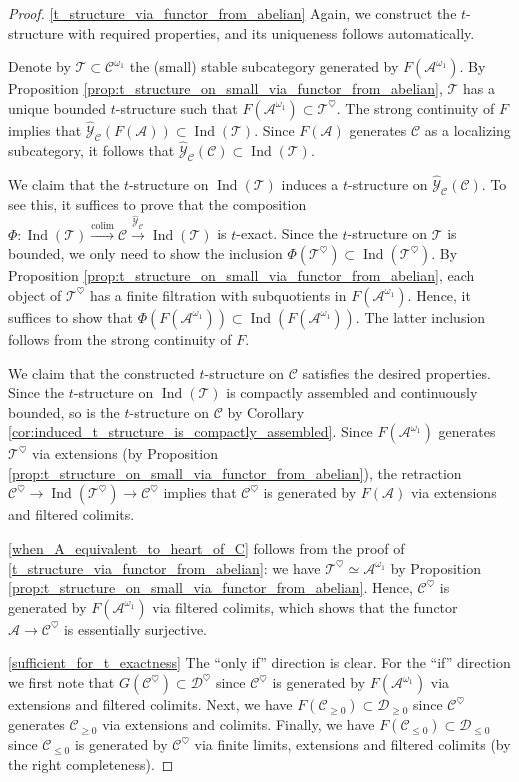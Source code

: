 \documentclass[11pt,leqno]{amsart}
\numberwithin{equation}{section}
\DeclareMathOperator*{\colim}{colim}
\newcommand{\xto}{\xrightarrow}
\newcommand{\cD}{{\mathcal D}}
\newcommand{\cA}{{\mathcal A}}
\newcommand{\cC}{{\mathcal C}}
\newcommand{\cY}{{\mathcal Y}}
\newcommand{\cT}{{\mathcal T}}
\newcommand{\Ind}{\operatorname{Ind}}
\begin{document}
\begin{proof}
\ref{t_structure_via_functor_from_abelian} Again, we construct the $t$-structure with required properties, and its uniqueness follows automatically.

Denote by $\cT\subset\cC^{\omega_1}$ the (small) stable subcategory generated by $F(\cA^{\omega_1}).$ By Proposition \ref{prop:t_structure_on_small_via_functor_from_abelian}, $\cT$ has a unique bounded $t$-structure such that $F(\cA^{\omega_1})\subset \cT^{\heartsuit}.$ The strong continuity of $F$ implies that $\hat{\cY}_{\cC}(F(\cA))\subset \Ind(\cT).$ Since $F(\cA)$ generates $\cC$ as a localizing subcategory, it follows that $\hat{\cY}_{\cC}(\cC)\subset\Ind(\cT).$ 

We claim that the $t$-structure on $\Ind(\cT)$ induces a $t$-structure on $\hat{\cY}_{\cC}(\cC).$ To see this, it suffices to prove that the composition $\Phi:\Ind(\cT)\xto{\colim}\cC\xto{\hat{\cY}_{\cC}}\Ind(\cT)$ is $t$-exact. Since the $t$-structure on $\cT$ is bounded, we only need to show the inclusion $\Phi(\cT^{\heartsuit})\subset \Ind(\cT^{\heartsuit}).$ By Proposition \ref{prop:t_structure_on_small_via_functor_from_abelian}, each object of $\cT^{\heartsuit}$ has a finite filtration with subquotients in $F(\cA^{\omega_1}).$ Hence, it suffices to show that $\Phi(F(\cA^{\omega_1}))\subset \Ind(F(\cA^{\omega_1})).$ The latter inclusion follows from the strong continuity of $F.$

We claim that the constructed $t$-structure on $\cC$ satisfies the desired properties. Since the $t$-structure on $\Ind(\cT)$ is compactly assembled and continuously bounded, so is the $t$-structure on $\cC$ by Corollary \ref{cor:induced_t_structure_is_compactly_assembled}. Since $F(\cA^{\omega_1})$ generates $\cT^{\heartsuit}$ via extensions (by Proposition \ref{prop:t_structure_on_small_via_functor_from_abelian}), the retraction $\cC^{\heartsuit}\to\Ind(\cT^{\heartsuit})\to\cC^{\heartsuit}$ implies that $\cC^{\heartsuit}$ is generated by $F(\cA)$ via extensions and filtered colimits.

\ref{when_A_equivalent_to_heart_of_C} follows from the proof of \ref{t_structure_via_functor_from_abelian}: we have $\cT^{\heartsuit}\simeq\cA^{\omega_1}$ by Proposition \ref{prop:t_structure_on_small_via_functor_from_abelian}. Hence, $\cC^{\heartsuit}$ is generated by $F(\cA^{\omega_1})$ via filtered colimits, which shows that the functor $\cA\to\cC^{\heartsuit}$ is essentially surjective.

\ref{sufficient_for_t_exactness} The ``only if'' direction is clear. For the ``if'' direction we first note that $G(\cC^{\heartsuit})\subset\cD^{\heartsuit}$ since $\cC^{\heartsuit}$ is generated by $F(\cA^{\omega_1})$ via extensions and filtered colimits. Next, we have $F(\cC_{\geq 0})\subset\cD_{\geq 0}$ since $\cC^{\heartsuit}$ generates $\cC_{\geq 0}$ via extensions and colimits. Finally, we have $F(\cC_{\leq 0})\subset\cD_{\leq 0}$ since $\cC_{\leq 0}$ is generated by $\cC^{\heartsuit}$ via finite limits, extensions and filtered colimits (by the right completeness).
\end{proof}
\end{document}

